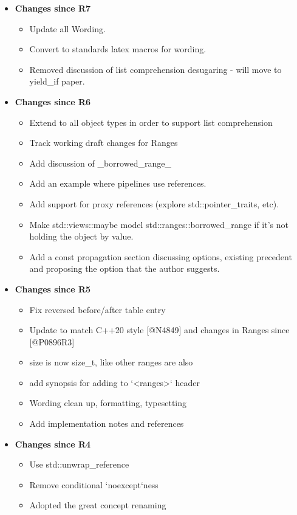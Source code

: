 \documentclass[a4paper,10pt,oneside,openany,final,article]{memoir}
\begin{document}
\begin{itemize}
\item \textbf{Changes since R7}
  \begin{itemize}
  \item Update all Wording.
  \item Convert to standards latex macros for wording.
  \item Removed discussion of list comprehension desugaring - will move to yield_if paper.
  \end{itemize}
\item \textbf{Changes since R6}
  \begin{itemize}
  \item Extend to all object types in order to support list comprehension
  \item Track working draft changes for Ranges
  \item Add discussion of _borrowed_range_
  \item Add an example where pipelines use references.
  \item Add support for proxy references (explore std::pointer_traits, etc).
  \item Make std::views::maybe model std::ranges::borrowed_range if it's not holding the object by value.
  \item Add a const propagation section discussing options, existing precedent and proposing the option that the author suggests.
  \end{itemize}
\item \textbf{Changes since R5}
  \begin{itemize}
  \item Fix reversed before/after table entry
  \item Update to match C++20 style [@N4849] and changes in Ranges since [@P0896R3]
  \item size is now size_t, like other ranges are also
  \item add synopsis for adding to `<ranges>` header
  \item Wording clean up, formatting, typesetting
  \item Add implementation notes and references
  \end{itemize}
\item \textbf{Changes since R4}
  \begin{itemize}
  \item Use std::unwrap\_reference
  \item Remove conditional `noexcept`ness
  \item Adopted the great concept renaming

\end{itemize}
\end{itemize}
\end{document}
